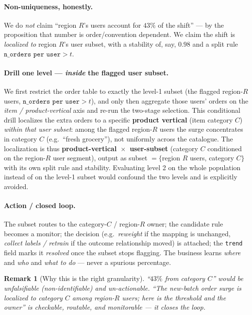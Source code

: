 \documentclass[11pt]{article}
\newtheorem{remark}{Remark}
\begin{document}
\paragraph{Non-uniqueness, honestly.} We do \emph{not} claim ``region $R$'s users
account for $43\%$ of the shift'' --- by the proposition that number is
order/convention dependent. We claim the shift is \emph{localized to} region
$R$'s user subset, with a stability of, say, $0.98$ and a split rule
$\texttt{n\_orders per user}>t$.

\paragraph{Drill one level --- \emph{inside} the flagged user subset.} We first
restrict the order table to exactly the level-1 subset (the flagged region-$R$
users, $\texttt{n\_orders per user}>t$), and only then aggregate those users'
orders on the \emph{item / product-vertical} axis and re-run the two-stage
selection. This conditional drill localizes the extra orders to a specific
\textbf{product vertical} (item category $C$) \emph{within that user subset}:
among the flagged region-$R$ users the surge concentrates in category $C$ (e.g.\
``fresh grocery''), not uniformly across the catalogue. The localization is thus
\textbf{product-vertical~$\times$~user-subset} (category $C$ conditioned on the
region-$R$ user segment), output as subset $=\{$region $R$ users, category $C\}$
with its own split rule and stability. Evaluating level 2 on the whole
population instead of on the level-1 subset would confound the two levels and is
explicitly avoided.

\paragraph{Action / closed loop.} The subset routes to the category-$C$ /
region-$R$ owner; the candidate rule becomes a monitor; the decision (e.g.\
\emph{reweight} if the mapping is unchanged, \emph{collect labels / retrain} if
the outcome relationship moved) is attached; the \texttt{trend} field marks it
\emph{resolved} once the subset stops flagging. The business learns \emph{where}
and \emph{who} and \emph{what to do} --- never a spurious percentage.

\begin{remark}[Why this is the right granularity]
``$43\%$ from category $C$'' would be unfalsifiable (non-identifiable) and
un-actionable. ``The new-batch order surge is localized to category $C$ among
region-$R$ users; here is the threshold and the owner'' is checkable, routable,
and monitorable --- it closes the loop.
\end{remark}
\end{document}
